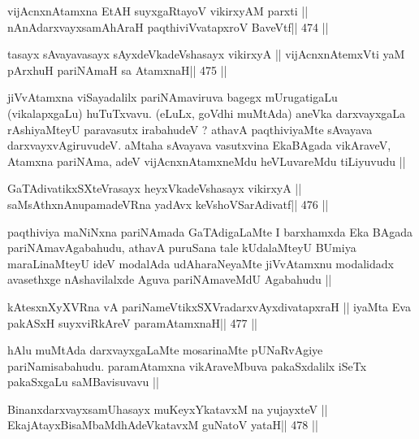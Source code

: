 

\begin{shl}
vijAcnxnAtamxna EtAH suyxgaRtayoV vikirxyAM parxti ||
nAnAdarxvayxsamAhAraH paqthiviVvatapxroV BaveVtf\hfill || 474 ||
\end{shl}

\begin{shl}
tasayx sAvayavasayx sAyxdeVkadeVshasayx vikirxyA ||
vijAcnxnAtemxVti yaM pArxhuH pariNAmaH sa AtamxnaH\hfill || 475 ||
\end{shl}

\begin{artha}
jiVvAtamxna viSayadalilx pariNAmaviruva bagegx mUrugatigaLu
(vikalapxgaLu) huTuTxvavu. (eLuLx, goVdhi muMtAda) aneVka darxvayxgaLa
rAshiyaMteyU paravasutx irabahudeV ? athavA paqthiviyaMte sAvayava
darxvayxvAgiruvudeV. aMtaha sAvayava vasutxvina EkaBAgada vikAraveV,
Atamxna pariNAma, adeV vijAcnxnAtamxneMdu heVLuvareMdu tiLiyuvudu ||
\end{artha}



\begin{shl}
GaTAdivatikxSXteVrasayx heyxVkadeVshasayx vikirxyA ||
saMsAthxnAnupamadeVRna yadAvx keVshoVSarAdivatf\hfill || 476 ||
\end{shl}

\begin{artha}
paqthiviya maNiNxna pariNAmada GaTAdigaLaMte I barxhamxda Eka BAgada
pariNAmavAgabahudu, athavA puruSana tale kUdalaMteyU BUmiya
maraLinaMteyU ideV modalAda udAharaNeyaMte jiVvAtamxnu modalidadx
avasethxge nAshavilalxde Aguva pariNAmaveMdU Agabahudu ||  
\end{artha}

\begin{shl}
kAtesxnXyXVRna vA pariNameVtikxSXVradarxvAyxdivatapxraH ||
iyaMta Eva pakASxH suyxviRkAreV paramAtamxnaH\hfill || 477 ||
\end{shl}

\begin{artha}
hAlu muMtAda darxvayxgaLaMte mosarinaMte pUNaRvAgiye pariNamisabahudu.
paramAtamxna vikAraveMbuva pakaSxdalilx iSeTx pakaSxgaLu saMBavisuvavu ||
\end{artha}


\begin{shl}
BinanxdarxvayxsamUhasayx muKeyxYkatavxM na yujayxteV ||
EkajAtayxBisaMbaMdhAdeVkatavxM guNatoV yataH\hfill || 478 ||
\end{shl}

